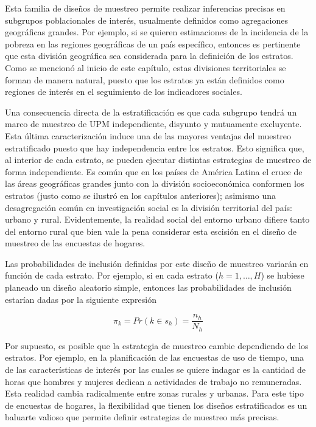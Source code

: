 \documentclass[
  10pt,
  spanish,
]{book}
\begin{document}
Esta familia de diseños de muestreo permite realizar inferencias precisas en subgrupos poblacionales de interés, usualmente definidos como agregaciones geográficas grandes. Por ejemplo, si se quieren estimaciones de la incidencia de la pobreza en las regiones geográficas de un país específico, entonces es pertinente que esta división geográfica sea considerada para la definición de los estratos. Como se mencionó al inicio de este capítulo, estas divisiones territoriales se forman de manera natural, puesto que los estratos ya están definidos como regiones de interés en el seguimiento de los indicadores sociales.

Una consecuencia directa de la estratificación es que cada subgrupo tendrá un marco de muestreo de UPM independiente, disyunto y mutuamente excluyente. Esta última caracterización induce una de las mayores ventajas del muestreo estratificado puesto que hay independencia entre los estratos. Esto significa que, al interior de cada estrato, se pueden ejecutar distintas estrategias de muestreo de forma independiente. Es común que en los países de América Latina el cruce de las áreas geográficas grandes junto con la división socioeconómica conformen los estratos (justo como se ilustró en los capítulos anteriores); asimismo una desagregación común en investigación social es la división territorial del país: urbano y rural. Evidentemente, la realidad social del entorno urbano difiere tanto del entorno rural que bien vale la pena considerar esta escisión en el diseño de muestreo de las encuestas de hogares.

Las probabilidades de inclusión definidas por este diseño de muestreo variarán en función de cada estrato. Por ejemplo, si en cada estrato (\(h=1, \ldots, H\)) se hubiese planeado un diseño aleatorio simple, entonces las probabilidades de inclusión estarían dadas por la siguiente expresión

\[\pi_k = Pr(k \in s_h) = \frac{n_h}{N_h}\]

Por supuesto, es posible que la estrategia de muestreo cambie dependiendo de los estratos. Por ejemplo, en la planificación de las encuestas de uso de tiempo, una de las características de interés por las cuales se quiere indagar es la cantidad de horas que hombres y mujeres dedican a actividades de trabajo no remuneradas. Esta realidad cambia radicalmente entre zonas rurales y urbanas. Para este tipo de encuestas de hogares, la flexibilidad que tienen los diseños estratificados es un baluarte valioso que permite definir estrategias de muestreo más precisas.
\end{document}
